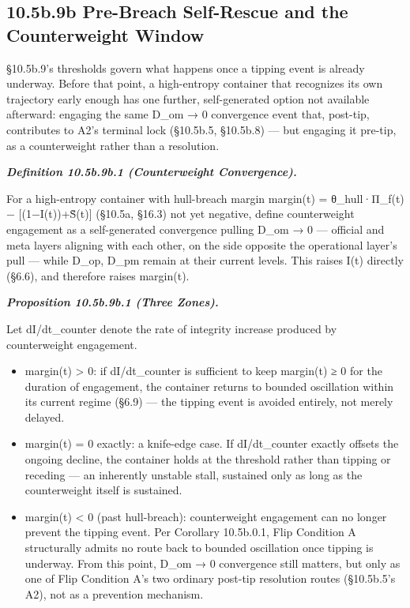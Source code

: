 \documentclass[
]{article}
\begin{document}
\hypertarget{b.9b-pre-breach-self-rescue-and-the-counterweight-window}{%
\subsection{10.5b.9b Pre-Breach Self-Rescue and the Counterweight
Window}\label{b.9b-pre-breach-self-rescue-and-the-counterweight-window}}

§10.5b.9's thresholds govern what happens once a tipping event is
already underway. Before that point, a high-entropy container that
recognizes its own trajectory early enough has one further,
self-generated option not available afterward: engaging the same D\_om →
0 convergence event that, post-tip, contributes to A2's terminal lock
(§10.5b.5, §10.5b.8) --- but engaging it pre-tip, as a counterweight
rather than a resolution.

\emph{\textbf{Definition 10.5b.9b.1 (Counterweight Convergence).}}

For a high-entropy container with hull-breach margin margin(t) =
θ\_hull·Π\_f(t) − {[}(1−I(t))+S̃(t){]} (§10.5a, §16.3) not yet negative,
define counterweight engagement as a self-generated convergence pulling
D\_om → 0 --- official and meta layers aligning with each other, on the
side opposite the operational layer's pull --- while D\_op, D\_pm remain
at their current levels. This raises I(t) directly (§6.6), and therefore
raises margin(t).

\emph{\textbf{Proposition 10.5b.9b.1 (Three Zones).}}

Let dI/dt\_counter denote the rate of integrity increase produced by
counterweight engagement.

\begin{itemize}
\item
  margin(t) \textgreater{} 0: if dI/dt\_counter is sufficient to keep
  margin(t) ≥ 0 for the duration of engagement, the container returns to
  bounded oscillation within its current regime (§6.9) --- the tipping
  event is avoided entirely, not merely delayed.
\item
  margin(t) = 0 exactly: a knife-edge case. If dI/dt\_counter exactly
  offsets the ongoing decline, the container holds at the threshold
  rather than tipping or receding --- an inherently unstable stall,
  sustained only as long as the counterweight itself is sustained.
\item
  margin(t) \textless{} 0 (past hull-breach): counterweight engagement
  can no longer prevent the tipping event. Per Corollary 10.5b.0.1, Flip
  Condition A structurally admits no route back to bounded oscillation
  once tipping is underway. From this point, D\_om → 0 convergence still
  matters, but only as one of Flip Condition A's two ordinary post-tip
  resolution routes (§10.5b.5's A2), not as a prevention mechanism.
\end{itemize}
\end{document}
